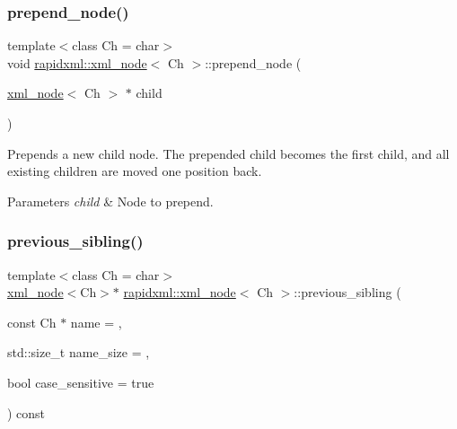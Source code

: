 \subsubsection{\texorpdfstring{prepend\+\_\+node()}{prepend\_node()}}
{\footnotesize\ttfamily template$<$class Ch = char$>$ \\
void \mbox{\hyperlink{classrapidxml_1_1xml__node}{rapidxml\+::xml\+\_\+node}}$<$ Ch $>$\+::prepend\+\_\+node (\begin{DoxyParamCaption}\item[{\mbox{\hyperlink{classrapidxml_1_1xml__node}{xml\+\_\+node}}$<$ Ch $>$ $\ast$}]{child }\end{DoxyParamCaption})\hspace{0.3cm}{\ttfamily [inline]}}

Prepends a new child node. The prepended child becomes the first child, and all existing children are moved one position back. 
\begin{DoxyParams}{Parameters}
{\em child} & Node to prepend. \\
\hline
\end{DoxyParams}
\mbox{\label{classrapidxml_1_1xml__node_aebcc42042ded78fb7020e2783f7d5426}} 
\subsubsection{\texorpdfstring{previous\+\_\+sibling()}{previous\_sibling()}}
{\footnotesize\ttfamily template$<$class Ch = char$>$ \\
\mbox{\hyperlink{classrapidxml_1_1xml__node}{xml\+\_\+node}}$<$Ch$>$$\ast$ \mbox{\hyperlink{classrapidxml_1_1xml__node}{rapidxml\+::xml\+\_\+node}}$<$ Ch $>$\+::previous\+\_\+sibling (\begin{DoxyParamCaption}\item[{const Ch $\ast$}]{name = {},  }\item[{std\+::size\+\_\+t}]{name\+\_\+size = {},  }\item[{bool}]{case\+\_\+sensitive = {\ttfamily true} }\end{DoxyParamCaption}) const\hspace{0.3cm}{\ttfamily [inline]}}

